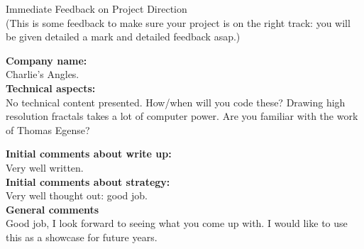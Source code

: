 \documentclass{article}
\begin{document}
\begin{center}
\Huge{Immediate Feedback on Project Direction}\\
\tiny{(This is some feedback to make sure your project is on the right track: you will be given detailed a mark and detailed feedback asap.)}
\end{center}


\normalsize
\textbf{Company name:}\\

Charlie's Angles. \\

\textbf{Technical aspects:}\\

No technical content presented.
How/when will you code these?
Drawing high resolution fractals takes a lot of computer power.
Are you familiar with the work of Thomas Egense?

\textbf{Initial comments about write up:}\\

Very well written.\\

\textbf{Initial comments about strategy:}\\

Very well thought out: good job.\\

\textbf{General comments}\\

Good job, I look forward to seeing what you come up with.
I would like to use this as a showcase for future years.\\
\end{document}
